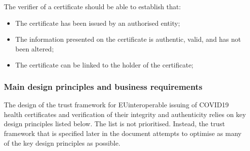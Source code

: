 \documentclass[a4paper,12pt,english]{sphinxhowto}
\begin{document}
\sphinxAtStartPar
The verifier of a certificate should be able to establish that:
\begin{itemize}
\item {} 
\sphinxAtStartPar
The certificate has been issued by an authorised entity;

\item {} 
\sphinxAtStartPar
The information presented on the certificate is authentic, valid, and has not been altered;

\item {} 
\sphinxAtStartPar
The certificate can be linked to the holder of the certificate;

\end{itemize}


\subsubsection{Main design principles and business requirements}
\label{\detokenize{ssi/annotehealth:main-design-principles-and-business-requirements}}
\sphinxAtStartPar
The design of the trust framework for EU\sphinxhyphen{}interoperable issuing of COVID\sphinxhyphen{}19 health certificates and verification of their integrity and authenticity relies on key design principles listed below. The list is not prioritised. Instead, the trust framework that is specified later in the document attempts to optimise as many of the key design principles as possible.
\end{document}
